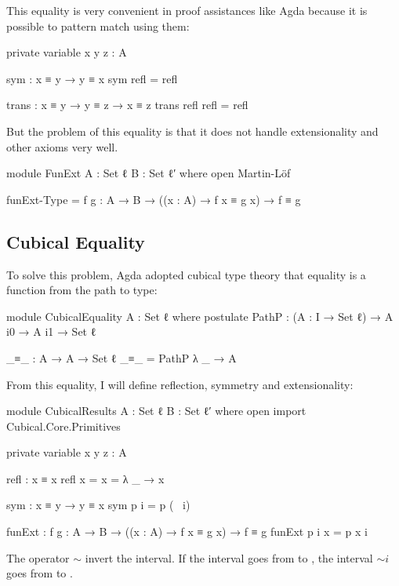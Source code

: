 \documentclass{article}
\begin{document}
This equality is very convenient in proof assistances like Agda because it is possible to pattern match using them:

\begin{code}
  private variable
    x y z : A

  sym  : x ≡ y → y ≡ x
  sym refl = refl

  trans : x ≡ y → y ≡ z → x ≡ z
  trans refl refl = refl
\end{code}

But the problem of this equality is that it does not handle extensionality and other axioms very well.

\begin{code}
module FunExt {A : Set ℓ} {B : Set ℓ′} where
  open Martin-Löf

  funExt-Type = {f g : A → B}
    → ((x : A) → f x ≡ g x) → f ≡ g
\end{code}

\subsection{Cubical Equality}

To solve this problem, Agda adopted cubical type theory that equality is a function from the path to type:

\begin{code}
module CubicalEquality {A : Set ℓ} where
  postulate
    PathP : (A : I → Set ℓ) → A i0 → A i1 → Set ℓ

  _≡_ : A → A → Set ℓ
  _≡_ = PathP λ _ → A
\end{code}

From this equality, I will define reflection, symmetry and extensionality:

\begin{code}
module CubicalResults {A : Set ℓ} {B : Set ℓ′} where
  open import Cubical.Core.Primitives

  private variable
    x y z : A

  refl : x ≡ x
  refl {x = x} = λ _ → x

  sym : x ≡ y → y ≡ x
  sym p i = p (~ i)

  funExt : {f g : A → B}
    → ((x : A) → f x ≡ g x) → f ≡ g
  funExt p i x = p x i
\end{code}

The operator $\sim$ invert the interval. If the interval  goes from
 to , the interval $\sim i$ goes from  to .
\end{document}
